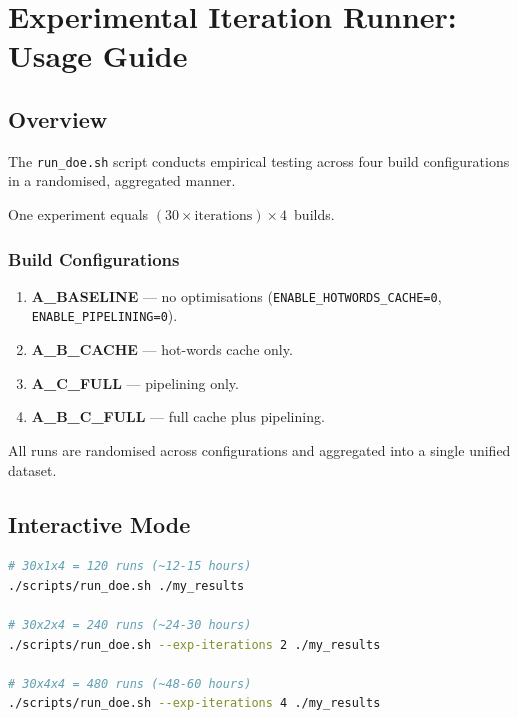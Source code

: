 
\section{Experimental Iteration Runner: Usage Guide}
\label{sec:exp-iteration-usage}

\subsection{Overview}

The \texttt{run\_doe.sh} script conducts empirical testing across four
build configurations in a randomised, aggregated manner.

One experiment equals $(30 \times \text{iterations}) \times 4$~builds.

\subsubsection{Build Configurations}

\begin{enumerate}
  \item \textbf{A\_BASELINE} — no optimisations (\texttt{ENABLE\_HOTWORDS\_CACHE=0},
    \texttt{ENABLE\_PIPELINING=0}).
  \item \textbf{A\_B\_CACHE} — hot-words cache only.
  \item \textbf{A\_C\_FULL} — pipelining only.
  \item \textbf{A\_B\_C\_FULL} — full cache plus pipelining.
\end{enumerate}

All runs are randomised across configurations and aggregated into a single
unified dataset.

\subsection{Interactive Mode}

\begin{lstlisting}[language=bash]
# 30x1x4 = 120 runs (~12-15 hours)
./scripts/run_doe.sh ./my_results

# 30x2x4 = 240 runs (~24-30 hours)
./scripts/run_doe.sh --exp-iterations 2 ./my_results

# 30x4x4 = 480 runs (~48-60 hours)
./scripts/run_doe.sh --exp-iterations 4 ./my_results
\end{lstlisting}

